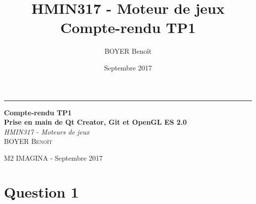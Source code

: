 \documentclass[a4paper,11pt]{report}
\title{HMIN317 - Moteur de jeux \\ Compte-rendu TP1}
\author{BOYER Benoît}
\date{Septembre 2017}
\begin{document}
  \begin{titlepage} %
	
	  \raggedleft %
	
	  \rule{1pt}{\textheight} %
	  \hspace{0.05\textwidth} %
	  \parbox[b]{0.75\textwidth}{ %
		
		  {\Huge\bfseries Compte-rendu TP1 \\[0.5\baselineskip] Prise en main de Qt Creator, Git et OpenGL ES 2.0}\\[2\baselineskip] %
		  {\large\textit{HMIN317 - Moteurs de jeux}}\\[4\baselineskip] %
		  {\Large\textsc{BOYER Benoît}} %
		
		  \vspace{0.5\textheight} %
		
		  {\noindent M2 IMAGINA - Septembre 2017}\\[\baselineskip] %
	  }

  \end{titlepage}
  
    \tableofcontents
    \pagebreak

    \section{Question 1}
\end{document}
